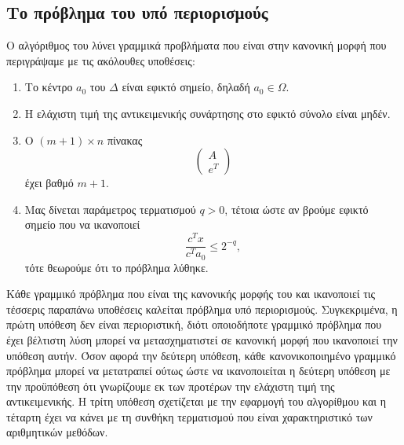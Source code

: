 \subsection{Το πρόβλημα του  υπό περιορισμούς}
Ο αλγόριθμος του  λύνει γραμμικά προβλήματα που είναι στην
κανονική μορφή που περιγράψαμε με τις ακόλουθες υποθέσεις:
\begin{enumerate}
    \item Το κέντρο \(a_0\) του  \(\Delta\) είναι εφικτό σημείο,
        δηλαδή \(a_0 \in \Omega\).
    \item Η ελάχιστη τιμή της αντικειμενικής συνάρτησης στο εφικτό σύνολο είναι
        μηδέν.
    \item O \( (m + 1) \times n \) πίνακας
        \begin{equation*}
            \begin{pmatrix} A \\ e^T \end{pmatrix}
        \end{equation*}
        έχει βαθμό \( m + 1 \).
    \item Μας δίνεται παράμετρος τερματισμού \( q > 0 \), τέτοια ώστε αν βρούμε
        εφικτό σημείο που να ικανοποιεί
        \begin{equation*}
            \frac{c^Tx}{c^Ta_0} \leq 2^{-q},
        \end{equation*}
        τότε θεωρούμε ότι το πρόβλημα λύθηκε.
\end{enumerate}
Κάθε γραμμικό πρόβλημα που είναι της κανονικής μορφής του  και
ικανοποιεί τις τέσσερις παραπάνω υποθέσεις καλείται πρόβλημα  υπό
περιορισμούς. Συγκεκριμένα, η πρώτη υπόθεση δεν είναι περιοριστική, διότι
οποιοδήποτε γραμμικό πρόβλημα που έχει βέλτιστη λύση μπορεί να μετασχηματιστεί
σε κανονική μορφή που ικανοποιεί την υπόθεση αυτήν. Όσον αφορά την δεύτερη
υπόθεση, κάθε κανονικοποιημένο γραμμικό πρόβλημα μπορεί να μετατραπεί ούτως ώστε
να ικανοποιείται η δεύτερη υπόθεση με την προϋπόθεση ότι γνωρίζουμε εκ των
προτέρων την ελάχιστη τιμή της αντικειμενικής. Η τρίτη υπόθεση σχετίζεται με την
εφαρμογή του αλγορίθμου και η τέταρτη έχει να κάνει με τη συνθήκη τερματισμού
που είναι χαρακτηριστικό των αριθμητικών μεθόδων.

